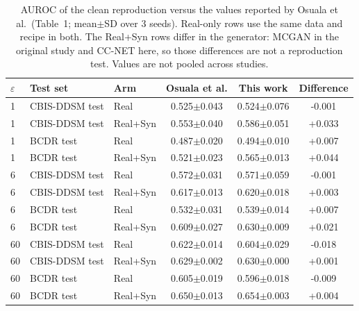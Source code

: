 \begin{table}[t]\centering\scriptsize\setlength{\tabcolsep}{3pt}
\caption{AUROC of the clean reproduction versus the values reported by Osuala et al.\ (Table~1; mean$\pm$SD over 3 seeds). Real-only rows use the same data and recipe in both. The Real+Syn rows differ in the generator: MCGAN in the original study and CC-NET here, so those differences are not a reproduction test. Values are not pooled across studies.}
\label{tab:osuala_comparison}
\begin{tabular}{lllccc}
\toprule
$\varepsilon$ & Test set & Arm & Osuala et al. & This work & Difference \\
\midrule
1 & CBIS-DDSM test & Real & 0.525$\pm$0.043 & 0.524$\pm$0.076 & -0.001 \\
1 & CBIS-DDSM test & Real+Syn & 0.553$\pm$0.040 & 0.586$\pm$0.051 & +0.033 \\
1 & BCDR test & Real & 0.487$\pm$0.020 & 0.494$\pm$0.010 & +0.007 \\
1 & BCDR test & Real+Syn & 0.521$\pm$0.023 & 0.565$\pm$0.013 & +0.044 \\
6 & CBIS-DDSM test & Real & 0.572$\pm$0.031 & 0.571$\pm$0.059 & -0.001 \\
6 & CBIS-DDSM test & Real+Syn & 0.617$\pm$0.013 & 0.620$\pm$0.018 & +0.003 \\
6 & BCDR test & Real & 0.532$\pm$0.031 & 0.539$\pm$0.014 & +0.007 \\
6 & BCDR test & Real+Syn & 0.609$\pm$0.027 & 0.630$\pm$0.009 & +0.021 \\
60 & CBIS-DDSM test & Real & 0.622$\pm$0.014 & 0.604$\pm$0.029 & -0.018 \\
60 & CBIS-DDSM test & Real+Syn & 0.629$\pm$0.002 & 0.630$\pm$0.000 & +0.001 \\
60 & BCDR test & Real & 0.605$\pm$0.019 & 0.596$\pm$0.018 & -0.009 \\
60 & BCDR test & Real+Syn & 0.650$\pm$0.013 & 0.654$\pm$0.003 & +0.004 \\
\bottomrule
\end{tabular}
\end{table}
